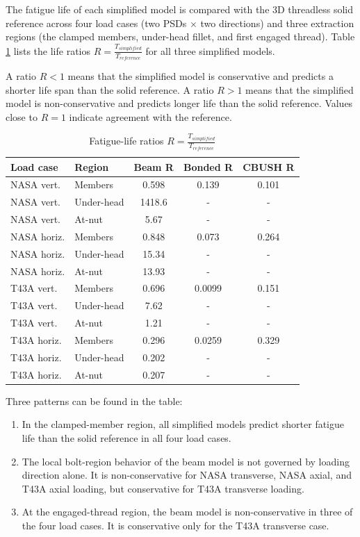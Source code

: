 \documentclass[a4paper,twoside]{bth}
\begin{document}
The fatigue life of each simplified model is compared with the 3D threadless solid reference across four load cases (two PSDs $\times$ two directions) and three extraction regions (the clamped members, under-head fillet, and first engaged thread). Table \ref{tab:fatLifeRatio} lists the life ratios $R = \tfrac{T_{simplified}}{T_{reference}}$ for all three simplified models.

A ratio $R < 1$ means that the simplified model is conservative and predicts a shorter life span than the solid reference. A ratio $R > 1$ means that the simplified model is non-conservative and predicts longer life than the solid reference. Values close to $R = 1$ indicate agreement with the reference.

\begin{table}[H]
    \centering
    \caption{Fatigue-life ratios $R = \tfrac{T_{simplified}}{T_{reference}}$}
    \label{tab:fatLifeRatio}
    \begin{tabular}{llccc}
        \toprule
        \textbf{Load case} & \textbf{Region} & \textbf{Beam R} & \textbf{Bonded R} & \textbf{CBUSH R} \\
        \midrule
        NASA vert.  & Members    & 0.598  & 0.139  & 0.101 \\
        NASA vert.  & Under-head & 1418.6 & -    & -   \\
        NASA vert.  & At-nut     & 5.67   & -    & -   \\
        NASA horiz. & Members    & 0.848  & 0.073  & 0.264 \\
        NASA horiz. & Under-head & 15.34  & -    & -   \\
        NASA horiz. & At-nut     & 13.93  & -    & -   \\
        T43A vert.  & Members    & 0.696  & 0.0099 & 0.151 \\
        T43A vert.  & Under-head & 7.62   & -    & -   \\
        T43A vert.  & At-nut     & 1.21   & -    & -   \\
        T43A horiz. & Members    & 0.296  & 0.0259 & 0.329 \\
        T43A horiz. & Under-head & 0.202  & -    & -   \\
        T43A horiz. & At-nut     & 0.207  & -    & -   \\
        \bottomrule
    \end{tabular}
\end{table}

Three patterns can be found in the table:
\begin{enumerate}
    \item In the clamped-member region, all simplified models predict shorter fatigue life than the solid reference in all four load cases.
    \item The local bolt-region behavior of the beam model is not governed by loading direction alone. It is non-conservative for NASA transverse, NASA axial, and T43A axial loading, but conservative for T43A transverse loading.
    \item At the engaged-thread region, the beam model is non-conservative in three of the four load cases. It is conservative only for the T43A transverse case.
\end{enumerate}
\end{document}
